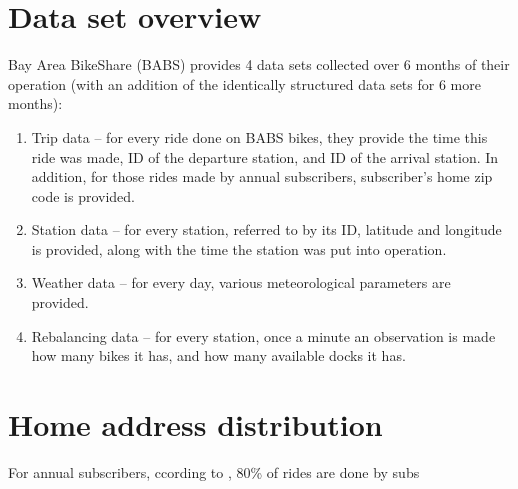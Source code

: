 \documentclass{article}
\begin{document}
\section{Data set overview}

Bay Area BikeShare (BABS) provides 4 data sets collected over 6 months of their operation (with an addition of the identically structured data sets for 6 more months):
\begin{enumerate}
	\item
		Trip data -- for every ride done on BABS bikes, they provide the time this ride was made, ID of the departure station, and ID of the arrival station. In addition, for those rides made by annual subscribers, subscriber's home zip code is provided.
	\item
		Station data -- for every station, referred to by its ID, latitude and longitude is provided, along with the time the station was put into operation.
	\item
		Weather data -- for every day, various meteorological parameters are provided.
	\item
		Rebalancing data -- for every station, once a minute an observation is made how many bikes it has, and how many available docks it has.
\end{enumerate}

\section{Home address distribution}

For annual subscribers, ccording to \cite{babs}, 80\% of rides are done by subs
\end{document}
